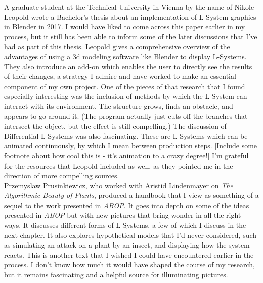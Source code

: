 \documentclass[12pt,twoside]{reedthesis}
\begin{document}
	A graduate student at the Technical University in Vienna by the name of Nikole Leopold wrote a Bachelor's thesis about an implementation of L-System graphics in Blender in 2017. I would have liked to come across this paper earlier in my process, but it still has been able to inform some of the later discussions that I've had as part of this thesis. Leopold gives a comprehensive overview of the advantages of using a 3d modeling software like Blender to display L-Systems. They also introduce an add-on which enables the user to directly see the results of their changes, a strategy I admire and have worked to make an essential component of my own project. One of the pieces of that research that I found especially interesting was the inclusion of methods by which the L-System can interact with its environment. The structure grows, finds an obstacle, and appears to go around it. (The program actually just cuts off the branches that intersect the object, but the effect is still compelling.) The discussion of Differential L-Systems was also fascinating. These are L-Systems which can be animated continuously, by which I mean between production steps. [Include some footnote about how cool this is - it's animation to a crazy degree!] I'm grateful for the resources that Leopold included as well, as they pointed me in the direction of more compelling sources.\\
	
	Przemyslaw Prusinkiewicz, who worked with Aristid Lindenmayer on \textit{The Algorithmic Beauty of Plants}, produced a handbook that I view as something of a sequel to the work presented in \textit{ABOP}. It goes into depth on some of the ideas presented in \textit{ABOP} but with new pictures that bring wonder in all the right ways. It discusses different forms of L-Systems, a few of which I discuss in the next chapter. It also explores hypothetical models that I'd never considered, such as simulating an attack on a plant by an insect, and displaying how the system reacts. This is another text that I wished I could have encountered earlier in the process. I don't know how much it would have shaped the course of my research, but it remains fascinating and a helpful source for illuminating pictures.\\
	
\end{document}
